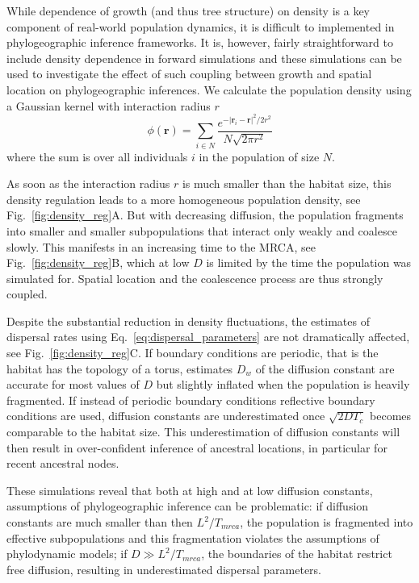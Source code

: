 \documentclass[aps,rmp, twocolumn]{revtex4}
\newcommand{\rvec}{\mathbf{r}}
\begin{document}
While dependence of growth (and thus tree structure) on density is a key component of real-world population dynamics, it is difficult to implemented in phylogeographic inference frameworks.
It is, however, fairly straightforward to include density dependence in forward simulations and these simulations can be used to investigate the effect of such coupling between growth and spatial location on phylogeographic inferences.
We calculate the population density using a Gaussian kernel with interaction radius $r$
\begin{equation}
    \phi(\rvec) = \sum_{i\in N} \frac{e^{-|\rvec_i - \rvec|^2/2r^2}}{N\sqrt{2\pi r^2}}
\end{equation}
where the sum is over all individuals $i$ in the population of size $N$.

As soon as the interaction radius $r$ is much smaller than the habitat size, this density regulation leads to a more homogeneous population density, see Fig.~\ref{fig:density_reg}A.
But with decreasing diffusion, the population fragments into smaller and smaller subpopulations that interact only weakly and coalesce slowly.
This manifests in an increasing time to the MRCA, see Fig.~\ref{fig:density_reg}B, which at low $D$ is limited by the time the population was simulated for.
Spatial location and the coalescence process are thus strongly coupled.

Despite the substantial reduction in density fluctuations, the estimates of dispersal rates using Eq.~\ref{eq:dispersal_parameters} are not dramatically affected, see Fig.~\ref{fig:density_reg}C.
If boundary conditions are periodic, that is the habitat has the topology of a torus, estimates $D_w$ of the diffusion constant are accurate for most values of $D$ but slightly inflated when the population is heavily fragmented.
If instead of periodic boundary conditions reflective boundary conditions are used, diffusion constants are underestimated once $\sqrt{2DT_c}$ becomes comparable to the habitat size.
This underestimation of diffusion constants will then result in over-confident inference of ancestral locations, in particular for recent ancestral nodes.

These simulations reveal that both at high and at low diffusion constants, assumptions of phylogeographic inference can be problematic: if diffusion constants are much smaller than then $L^2/T_{mrca}$, the population is fragmented into effective subpopulations and this fragmentation violates the assumptions of phylodynamic models; if $D\gg L^2/T_{mrca}$, the boundaries of the habitat restrict free diffusion, resulting in underestimated dispersal parameters.
\end{document}
